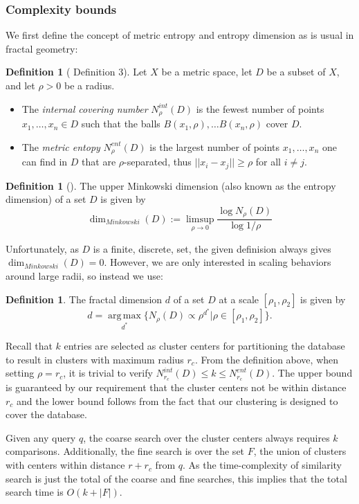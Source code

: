 \documentclass[review,preprint,12pt]{elsarticle}
\renewcommand{\cite}{\citep} %
\theoremstyle{definition}
\newtheorem{definition}[theorem]{Definition}
\theoremstyle{remark}
\begin{document}
\subsubsection{Complexity bounds}
We first define the concept of metric entropy and entropy dimension as is usual in fractal geometry:
\begin{definition}[\cite{tao2014metric} Definition 3] 
    Let $X$ be a metric space, let $D$ be a subset of $X$, and let $\rho>0$ be a radius.
    \begin{itemize}
        \item The \textit{internal covering number} $N_\rho^{int}(D)$ is the fewest number of points $x_1, \ldots, x_n \in D$ such that the balls $B(x_1,\rho), \ldots B(x_n,\rho)$ cover $D$.
        \item The \textit{metric entopy} $N_\rho^{ent}(D)$ is the largest number of points $x_1, \ldots, x_n$ one can find in $D$ that are $\rho$-separated, thus $||x_i - x_j|| \ge \rho$ for all $i \ne j$.
    \end{itemize}
\end{definition}
\begin{definition}[\cite{falconer2013fractal}]
    The upper Minkowski dimension (also known as the entropy dimension) of a set $D$ is given by 
\[
    \dim_{Minkowski}(D) := \limsup_{\rho \to 0} \frac{\log N_\rho(D)}{\log 1/\rho}
\]
\end{definition}
Unfortunately, as $D$ is a finite, discrete, set, the given definision always gives $\dim_{Minkowski}(D) = 0$.
However, we are only interested in scaling behaviors around large radii, so instead we use:
\begin{definition}
    The fractal dimension $d$ of a set $D$ at a scale $[\rho_1,\rho_2]$ is given by
    \[
        d = \operatorname*{arg\,max}_{d^*} \{ N_\rho(D) \propto \rho^{d^*} | \rho \in [\rho_1,\rho_2] \}.
    \]
\end{definition}

Recall that $k$ entries are selected as cluster centers for partitioning the database to result in clusters with maximum radius $r_c$.
From the definition above, when setting $\rho = r_c$, it is trivial to verify $ N_{r_c}^{int}(D) \le k \le N_{r_c}^{ent} (D)$.
The upper bound is guaranteed by our requirement that the cluster centers not be within distance $r_c$ and the lower bound follows from the fact that our clustering is designed to cover the database.

Given any query $q$, the coarse search over the cluster centers always requires $k$ comparisons.
Additionally, the fine search is over the set $F$, the union of clusters with centers within distance $r+r_c$ from $q$.
As the time-complexity of similarity search is just the total of the coarse and fine searches, this implies that the total search time is $O(k + |F|)$.
\end{document}
